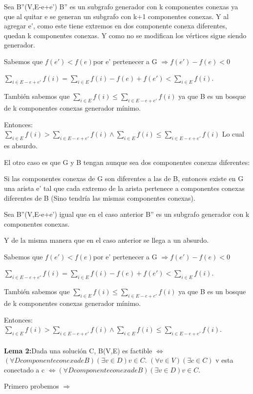Sea B''(V,E-e+e') B'' es un subgrafo generador con k componentes conexas ya que al quitar e se generan un subgrafo con k+1 componentes conexas. Y al agregar e', como este  tiene extremos en dos componente conexa diferentes, quedan k componentes conexas. Y como no se modifican los vértices sigue siendo generador.

Sabemos que $f(e') < f(e) $por e' pertenecer a G $\Rightarrow f(e') - f(e) < 0$

$\sum_{i \in E-e+e'} f(i) = \sum_{i \in E} f(i) - f(e) + f(e') < \sum_{i \in E} f(i)$.

También sabemos que $\sum_{i \in E} f(i) \leq \sum_{i \in E-e+e'} f(i)$ ya que B es un bosque de k componentes conexas generador mínimo.

Entonces: $\sum_{i \in E} f(i) > \sum_{i \in E-e+e'} f(i) \wedge \sum_{i \in E} f(i) \leq \sum_{i \in E-e+e'} f(i)$
Lo cual es absurdo.

El otro caso es que G y B tengan aunque sea dos componentes conexas diferentes:

Si las componentes conexas de G son diferentes a las de B, entonces existe en G una arista e' tal que cada extremo de la arista pertenece a componentes conexas diferentes de B (Sino tendría las mismas componentes conexas).

Sea B''(V,E-e+e') igual que en el caso anterior B'' es un subgrafo generador con k componentes conexas.

Y de la misma manera que en el caso anterior se llega a un absurdo.

Sabemos que $f(e') < f(e) $por e' pertenecer a G $\Rightarrow f(e') - f(e) < 0$

$\sum_{i \in E-e+e'} f(i) = \sum_{i \in E} f(i) - f(e) + f(e') < \sum_{i \in E} f(i)$.

También sabemos que $\sum_{i \in E} f(i) \leq \sum_{i \in E-e+e'} f(i)$ ya que B es un bosque de k componentes conexas generador mínimo.

Entonces: $\sum_{i \in E} f(i) > \sum_{i \in E-e+e'} f(i) \wedge \sum_{i \in E} f(i) \leq \sum_{i \in E-e+e'} f(i)$. \\ \\


\textbf{Lema 2:}Dada una solución C, B(V,E) es factible $\Longleftrightarrow$ $(\forall D componente conexa de B)(\exists v \in D) v \in C$.  $(\forall v \in V)(\exists c \in C)$ v esta conectado a c $\Leftrightarrow (\forall D componente conexa de B)(\exists v \in D) v \in C$.


Primero probemos $\Rightarrow$

